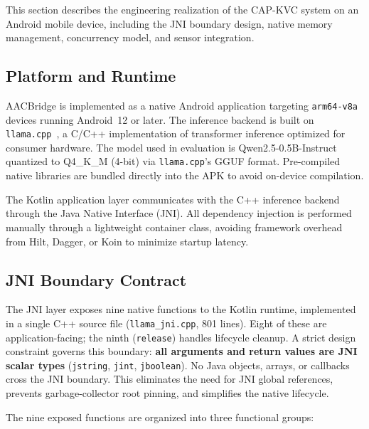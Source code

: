 \documentclass[journal]{IEEEtran}
\begin{document}
This section describes the engineering realization of the CAP-KVC system on an Android mobile device, including the JNI boundary design, native memory management, concurrency model, and sensor integration.

\subsection{Platform and Runtime}
\label{sec:platform}

AACBridge is implemented as a native Android application targeting \texttt{arm64-v8a} devices running Android~12 or later. The inference backend is built on \texttt{llama.cpp}~\cite{llamacpp}, a C/C++ implementation of transformer inference optimized for consumer hardware. The model used in evaluation is Qwen2.5-0.5B-Instruct~\cite{qwen25} quantized to Q4\_K\_M (4-bit) via \texttt{llama.cpp}'s GGUF format. Pre-compiled native libraries are bundled directly into the APK to avoid on-device compilation.

The Kotlin application layer communicates with the C++ inference backend through the Java Native Interface (JNI). All dependency injection is performed manually through a lightweight container class, avoiding framework overhead from Hilt, Dagger, or Koin to minimize startup latency.

\subsection{JNI Boundary Contract}
\label{sec:jni}

The JNI layer exposes nine native functions to the Kotlin runtime, implemented in a single C++ source file (\texttt{llama\_jni.cpp}, 801 lines). Eight of these are application-facing; the ninth (\texttt{release}) handles lifecycle cleanup. A strict design constraint governs this boundary: \textbf{all arguments and return values are JNI scalar types} (\texttt{jstring}, \texttt{jint}, \texttt{jboolean}). No Java objects, arrays, or callbacks cross the JNI boundary. This eliminates the need for JNI global references, prevents garbage-collector root pinning, and simplifies the native lifecycle.

The nine exposed functions are organized into three functional groups:
\end{document}
